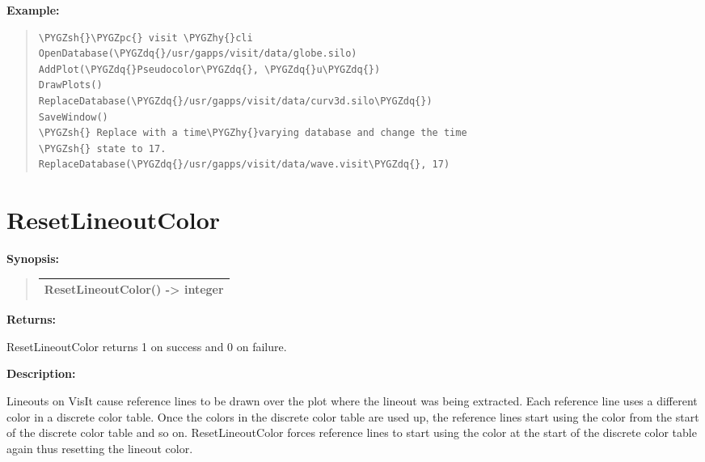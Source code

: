 \documentclass[letterpaper,10pt,english]{sphinxmanual}
\def\PYGZsh{\char`\#}
\def\PYGZpc{\char`\%}
\def\PYGZhy{\char`\-}
\def\PYGZdq{\char`\"}
\begin{document}
\begin{DUlineblock}{0em}
\item[] 
\end{DUlineblock}

\begin{DUlineblock}{0em}
\item[] \textbf{Example:}
\item[] 
\end{DUlineblock}
\begin{quote}

\begin{Verbatim}[commandchars=\\\{\}]
\PYGZsh{}\PYGZpc{} visit \PYGZhy{}cli
OpenDatabase(\PYGZdq{}/usr/gapps/visit/data/globe.silo)
AddPlot(\PYGZdq{}Pseudocolor\PYGZdq{}, \PYGZdq{}u\PYGZdq{})
DrawPlots()
ReplaceDatabase(\PYGZdq{}/usr/gapps/visit/data/curv3d.silo\PYGZdq{})
SaveWindow()
\PYGZsh{} Replace with a time\PYGZhy{}varying database and change the time
\PYGZsh{} state to 17.
ReplaceDatabase(\PYGZdq{}/usr/gapps/visit/data/wave.visit\PYGZdq{}, 17)
\end{Verbatim}
\end{quote}


\section{ResetLineoutColor}
\label{functions:resetlineoutcolor}
\begin{DUlineblock}{0em}
\item[] \textbf{Synopsis:}
\end{DUlineblock}
\begin{quote}

\begin{tabulary}{\linewidth}{|L|}
\hline

ResetLineoutColor() -\textgreater{} integer
\\
\hline\end{tabulary}

\end{quote}

\begin{DUlineblock}{0em}
\item[] 
\item[] \textbf{Returns:}
\item[] ResetLineoutColor returns 1 on success and 0 on failure.
\item[] 
\item[] \textbf{Description:}
\item[] Lineouts on VisIt cause reference lines to be drawn over the plot where
the lineout was being extracted. Each reference line uses a different color
in a discrete color table. Once the colors in the discrete color table are
used up, the reference lines start using the color from the start of the
discrete color table and so on. ResetLineoutColor forces reference lines to
start using the color at the start of the discrete color table again thus
resetting the lineout color.
\end{DUlineblock}
\end{document}
